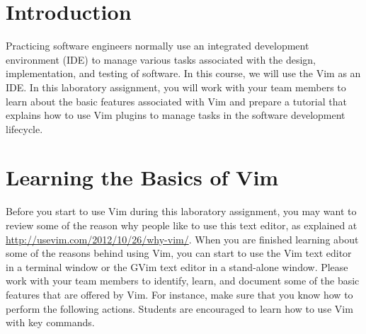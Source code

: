 

\usepackage[compact]{titlesec}



\section*{Introduction}

Practicing software engineers normally use an integrated development environment (IDE) to manage various tasks
associated with the design, implementation, and testing of software. In this course, we will use the Vim as an IDE.  In
this laboratory assignment, you will work with your team members to learn about the basic features associated with Vim
and prepare a tutorial that explains how to use Vim plugins to manage tasks in the software development lifecycle.

\section*{Learning the Basics of Vim}

Before you start to use Vim during this laboratory assignment, you may want to review some of the reason why people like
to use this text editor, as explained at \url{http://usevim.com/2012/10/26/why-vim/}.  When you are finished learning
about some of the reasons behind using Vim, you can start to use the Vim text editor in a terminal window or the GVim
text editor in a stand-alone window.  Please work with your team members to identify, learn, and document some of the
basic features that are offered by Vim.  For instance, make sure that you know how to perform the following actions.
Students are encouraged to learn how to use Vim with key commands.

